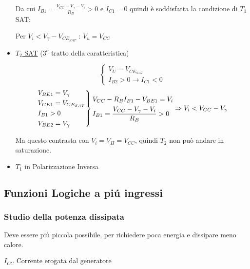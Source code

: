 \documentclass{article}
\begin{document}
\begin{itemize}
            Da cui $I_{B1} = \frac{V_{CC} - V_\gamma - V_i}{R_B} > 0$ e $I_{C1} = 0$ quindi è soddisfatta la condizione di $T_1$ SAT:

            Per $V_i < V_\gamma - V_{CE_{SAT}}$ : $V_u = V_{CC}$

        \item \underline{$T_2$ SAT} ($3^o$ tratto della caratteristica)

            \[
                \begin{cases}
                    V_U = V_{CE_{SAT}}\\
                    I_{B2} > 0 \rightarrow I_{C1} < 0
                \end{cases}
            \]
            \[
                \begin{rcases}
                    V_{BE1} = V_\gamma\\
                    V_{CE1} = V_{CE_{SAT}}\\
                    I_{B1} > 0\\
                    V_{BE2} = V_\gamma
                \end{rcases}
                \begin{aligned}
                    &V_{CC} - R_B I_{B1} - V_{BE1} = V_i\\
                    &I_{B1} = \frac{V_{CC} - V_\gamma - V_i } {R_B} > 0
                \end{aligned} \Rightarrow V_i < V_{CC} - V_\gamma
            \]

            Ma questo contrasta con $V_i = V_H = V_{CC}$, quindi $T_2$ non può andare in saturazione.

        \item $T_1$ in Polarizzazione Inversa
    \end{itemize}

\subsection{Funzioni Logiche a pi\'u ingressi}

\subsubsection*{Studio della potenza dissipata}
Deve essere più piccola possibile, per richiedere poca energia e dissipare meno calore.

$I_{CC}$ Corrente erogata dal generatore
\end{document}
